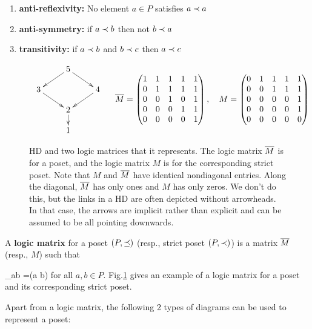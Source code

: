 \begin{enumerate}
\item
{\bf anti-reflexivity:}
No element $a\in P$ satisfies $a\prec  a$

\item
{\bf anti-symmetry:}
if $a\prec b$ then
not  $b\prec a$

\item{\bf transitivity:}
if $a\prec  b$ and $b\prec  c$ then $a\prec  c$

\end{enumerate}
\begin{figure}[h!]
$$
\bcen
\xymatrix@R=1pc{
&5\ar[dl]\ar[dr]
\\
3\ar[dr]
&&4\ar[dl]
\\
&2\ar[d]
\\
&1
}
\ecen
\quad
\ol{M}=
\begin{pmatrix}
1&1&1&1&1
\\
0&1&1&1&1
\\
0&0&1&0&1
\\
0&0&0&1&1
\\
0&0&0&0&1
\end{pmatrix},\quad
M=
\begin{pmatrix}
0&1&1&1&1
\\
0&0&1&1&1
\\
0&0&0&0&1
\\
0&0&0&0&1
\\
0&0&0&0&0
\end{pmatrix}
$$
\caption{HD and two logic matrices that it represents. The logic matrix $\overline{M}$ is for a  poset, and the logic matrix ${M}$ is for the corresponding strict
poset. Note that $M$ and $\overline{M}$ have identical nondiagonal entries.
Along the diagonal,
$\overline{M}$
has only ones and $M$ has only zeros.
We don't do this, but
the links in a HD are often depicted without arrowheads. In that case, the arrows are implicit rather than explicit and can be assumed  to be all pointing downwards.}
\label{fig-logic-matrices}
\end{figure}


A {\bf logic matrix}
for a poset $(P,  \preceq )$ (resp., strict poset $(P, \prec)$) is a matrix $\overline{M}$ (resp., $M$) such that

\beq
{}_{ab} =\indi(a \pord  b) \quad {}
\eeq
for all $a, b\in P$.
Fig.\ref{fig-logic-matrices}
gives an example of a
logic matrix for a poset and its corresponding strict poset.

Apart from a logic matrix, the following 2 types of diagrams can be used to represent a poset:

